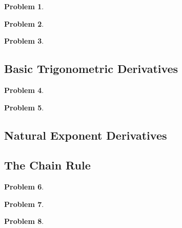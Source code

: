 \documentclass{article}
\newtheorem{problem}{Problem}
\begin{document}
\begin{problem}

\end{problem}


\begin{problem}

\end{problem}


\begin{problem}

\end{problem}


\subsection{Basic Trigonometric Derivatives}\label{secMPStrigDerivatives}
\begin{problem}

\end{problem}
\begin{problem}

\end{problem}
\subsection{Natural Exponent Derivatives}


\subsection{The Chain Rule}\label{secMPSchainRule}

\begin{problem}

\end{problem}


\begin{problem}

\end{problem}

\begin{problem}

\end{problem}

\end{document}
